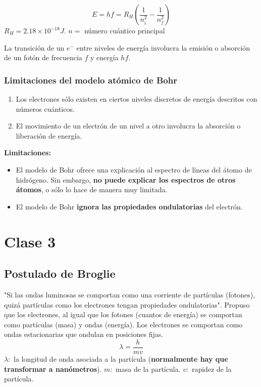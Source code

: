 \documentclass{article}
\begin{document}
\begin{equation}
    E=hf=R_H(\frac{1}{n_{i}^{2}}-\frac{1}{n_{f}^{2}})
\end{equation}
$R_H=2.18 \times 10^{-18}J$.
$n=$ número cuántico principal

La transición de un $e^-$ entre niveles de energía involucra la emisión o absorción de un fotón de frecuencia $f$ y energía $hf$.

\subsubsection{Limitaciones del modelo atómico de Bohr}
\begin{enumerate}
    \item Los electrones sólo existen en ciertos niveles discretos de energía descritos con números cuánticos.
    \item El movimiento de un electrón de un nivel a otro involucra la absorción o liberación de energía.
\end{enumerate}
\textbf{Limitaciones:}
\begin{itemize}
    \item El modelo de Bohr ofrece una explicación al espectro de líneas del átomo de hidrógeno. Sin embargo, \textbf{no puede explicar los espectros de otros átomos}, o sólo lo hace de manera muy limitada.
    \item El modelo de Bohr \textbf{ignora las propiedades ondulatorias} del electrón.
\end{itemize}


\section{Clase 3}
\subsection{Postulado de Broglie}
"Si las ondas luminosas se comportan como una corriente de partículas (fotones), quizá partículas como los electrones tengan propiedades ondulatorias".
Propuso que los electrones, al igual que los fotones (cuantos de energía) se comportan como partículas (masa) y ondas (energía).
Los electrones se comportan como ondas estacionarias que ondulan en posiciones fijas.
\begin{equation}
    \lambda=\frac{h}{mv}
\end{equation}
$\lambda:$ la longitud de onda asociada a la partícula (\textbf{normalmente hay que transformar a nanómetros}).
$m:$ masa de la partícula.
$v:$ rapidez de la partícula.
\end{document}
